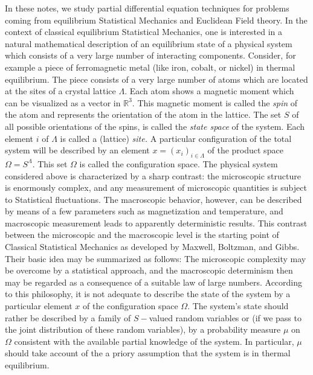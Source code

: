 \documentclass{article}
\begin{document}
In these notes, we study partial differential equation techniques for
problems coming from equilibrium Statistical Mechanics and Euclidean Field
theory. In the context of classical equilibrium Statistical Mechanics, one
is interested in a natural mathematical description of an equilibrium state
of a physical system which consists of a very large number of interacting
components. Consider, for example a piece of ferromagnetic metal (like iron,
cobalt, or nickel) in thermal equilibrium. The piece consists of a very
large number of atoms which are located at the sites of a crystal lattice $%
\Lambda .$ Each atom shows a magnetic moment which can be visualized as a
vector in $\mathbb{R}^{3}.$ This magnetic moment is called the \textit{spin }%
of the atom and represents the orientation of the atom in the lattice. The
set $S$ of all possible orientations of the spins, is called the \textit{%
state space} of the system. Each element $i$ of $\Lambda $ is called a
(lattice) \textit{site.} A particular configuration of the total system will
be described by an element $x=\left( x_{i}\right) _{i\in \Lambda }$ of the
product space $\Omega =S^{\Lambda }.$ This set $\Omega $ is called the
configuration space.\newline
The physical system considered above is characterized by a sharp contrast:
the microscopic structure is enormously complex, and any measurement of
microscopic quantities is subject to Statistical fluctuations. The
macroscopic behavior, however, can be described by means of a few parameters
such as magnetization and temperature, and macroscopic measurement leads to
apparently deterministic results. This contrast between the microscopic and
the macroscopic level is the starting point of Classical Statistical
Mechanics as developed by Maxwell, Boltzman, and Gibbs. Their basic idea may
be summarized as follows: The microscopic complexity may be overcome by a
statistical approach, and the macroscopic determinism then may be regarded
as a consequence of a suitable law of large numbers. According to this
philosophy, it is not adequate to describe the state of the system by a
particular element $x$ of the configuration space $\Omega .$ The system's
state should rather be described by a family of $S-$valued random variables
or (if we pass to the joint distribution of these random variables), by a
probability measure $\mu $ on $\Omega $ consistent with the available
partial knowledge of the system. In particular, $\mu $ should take account
of the a priory assumption that the system is in thermal equilibrium.\newline
\end{document}
